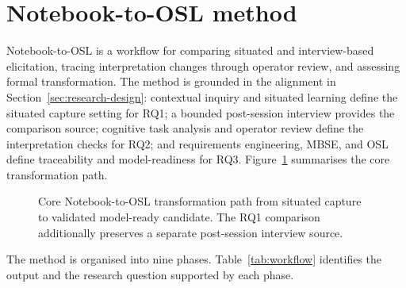 \section{Notebook-to-OSL method}
\label{sec:method}

Notebook-to-OSL is a workflow for comparing situated and interview-based elicitation, tracing interpretation changes through operator review, and assessing formal transformation. The method is grounded in the alignment in Section~\ref{sec:research-design}: contextual inquiry and situated learning define the situated capture setting for RQ1; a bounded post-session interview provides the comparison source; cognitive task analysis and operator review define the interpretation checks for RQ2; and requirements engineering, MBSE, and OSL define traceability and model-readiness for RQ3. Figure~\ref{fig:notebook-to-osl-workflow} summarises the core transformation path.

\begin{figure}[htbp]
    \centering
    
    \caption{Core Notebook-to-OSL transformation path from situated capture to validated model-ready candidate. The RQ1 comparison additionally preserves a separate post-session interview source.}
    \label{fig:notebook-to-osl-workflow}
\end{figure}

The method is organised into nine phases. Table~\ref{tab:workflow} identifies the output and the research question supported by each phase.

